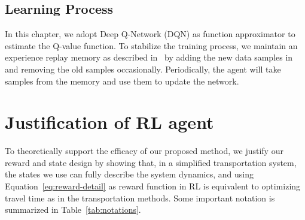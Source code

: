 \vspace{-1mm}
\subsection{Learning Process}






In this chapter, we adopt Deep Q-Network (DQN) as function approximator to estimate the Q-value function. To stabilize the training process, we maintain an experience replay memory as described in~\cite{MKSR+15} by adding the new data samples in and removing the old samples occasionally. Periodically, the agent will take samples from the memory and use them to update the network.


\section{Justification of RL agent}
To theoretically support the efficacy of our proposed method, we justify our reward and state design by showing that, in a simplified transportation system, the states we use can fully describe the system dynamics, and using Equation~\eqref{eq:reward-detail} as reward function in RL is equivalent to optimizing travel time as in the transportation methods. Some important notation is summarized in Table~\ref{tab:notations}.
\vspace{-3mm}


